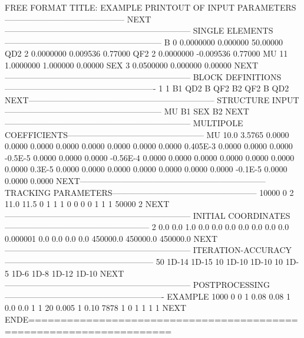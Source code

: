 \begin{ctverbatim}
FREE FORMAT   TITLE: EXAMPLE
PRINTOUT OF INPUT PARAMETERS--------------------------------------------
NEXT--------------------------------------------------------------------
SINGLE ELEMENTS---------------------------------------------------------
    B      0  0.0000000   0.000000  50.00000
    QD2    2  0.0000000   0.009536   0.77000
    QF2    2  0.0000000  -0.009536   0.77000
    MU    11  1.0000000   1.000000   0.00000
    SEX    3  0.0500000   0.000000   0.00000
NEXT--------------------------------------------------------------------
BLOCK DEFINITIONS-------------------------------------------------------
    1  1
    B1  QD2  B  QF2
    B2  QF2  B  QD2
NEXT--------------------------------------------------------------------
STRUCTURE INPUT---------------------------------------------------------
    MU  B1  SEX  B2
NEXT--------------------------------------------------------------------
MULTIPOLE COEFFICIENTS--------------------------------------------------
    MU       10.0       3.5765
    0.0000    0.0000    0.0000    0.0000
    0.0000    0.0000    0.0000    0.0000
    0.405E-3  0.0000    0.0000    0.0000
   -0.5E-5    0.0000    0.0000    0.0000
   -0.56E-4   0.0000    0.0000    0.0000
    0.0000    0.0000    0.0000    0.0000
    0.3E-5    0.0000    0.0000    0.0000
    0.0000    0.0000    0.0000    0.0000
   -0.1E-5    0.0000    0.0000    0.0000
NEXT--------------------------------------------------------------------
TRACKING PARAMETERS-----------------------------------------------------
  10000  0  2  11.0  11.5  0  1
      1  1  0   0
      0  0  1   1  1 50000 2
NEXT--------------------------------------------------------------------
INITIAL COORDINATES-----------------------------------------------------
      2    0.0   0.0   1.0
      0.0
      0.0
      0.0
      0.0
      0.0
      0.0
      0.0
      0.000001
      0.0
      0.0
      0.0
      0.0
 450000.0
 450000.0
 450000.0
NEXT--------------------------------------------------------------------
ITERATION-ACCURACY------------------------------------------------------
    50    1D-14  1D-15
    10    1D-10  1D-10
    10    1D-5   1D-6
    1D-8  1D-12  1D-10
NEXT--------------------------------------------------------------------
POSTPROCESSING----------------------------------------------------------
EXAMPLE
    1000    0    0  1   0.08  0.08   1
       0.0  0.0  1  1  20     0.005  1  0.10
    7878    1    0  1   1     1      1
NEXT
ENDE====================================================================
\end{ctverbatim}

